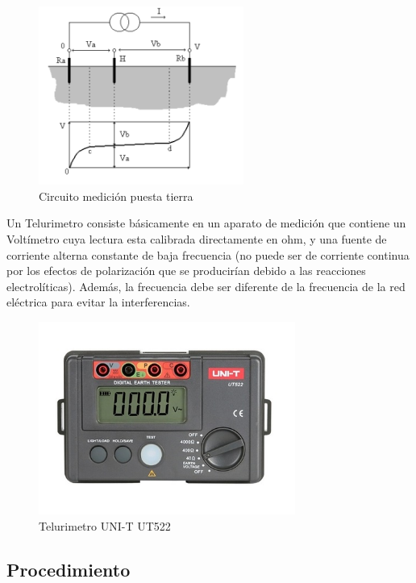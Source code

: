 \documentclass[12pt, letterpaper]{article}
\begin{document}
\begin{figure}[H]
	\centering
	\includegraphics[width=0.6\textwidth]{imagenes/medida_puesta_t.png}
	\caption{Circuito medición puesta tierra}
	\label{fig:med_puesta_tie}
\end{figure}
\singlespacing
Un Telurimetro consiste básicamente en un aparato de medición que contiene un Voltímetro cuya lectura esta calibrada directamente en ohm, y una fuente de corriente alterna constante de baja frecuencia (no puede ser de corriente continua por los efectos de polarización
que se producirían debido a las reacciones electrolíticas). Además, la frecuencia debe ser diferente de la frecuencia de la red eléctrica para evitar la interferencias.
\singlespacing
\begin{figure}[H]
	\centering
	\includegraphics[width=0.75\textwidth]{imagenes/Telerimetro_UNIT.jpg}
	\caption{Telurimetro UNI-T UT522}
	\label{fig:telurimetro}
\end{figure}
\subsection{Procedimiento}
\end{document}
